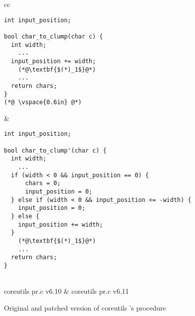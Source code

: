 \begin{figure*}
\centering
\begin{tabular}{cc}
\begin{lstlisting}
int input_position;

bool char_to_clump(char c) {
  int width;
    ...
  input_position += width;
    (*@\textbf{$(*)_1$}@*)
    ...
  return chars;
}
(*@ \vspace{0.6in} @*)
\end{lstlisting}
\hspace{1.0in}
&
\begin{lstlisting}
int input_position;

bool char_to_clump'(char c) {
  int width;
    ...
  if (width < 0 && input_position == 0) {
      chars = 0;
      input_position = 0;
  } else if (width < 0 && input_position <= -width) {
    input_position = 0;
  } else {
    input_position += width;
  }
    (*@\textbf{$(*)_1$}@*)
    ...
  return chars;
}
\end{lstlisting}
\\
coreutils pr.c v6.10 & coreutils pr.c v6.11
\end{tabular}
\caption{Original and patched version of coreutils 's  procedure}
\end{figure*}